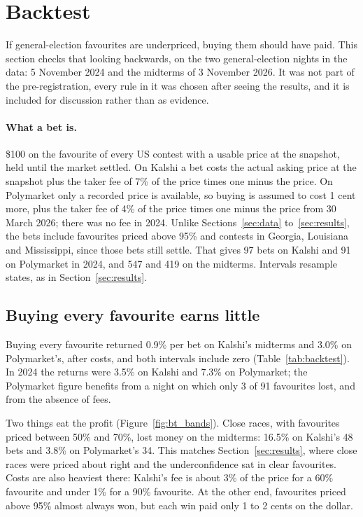 \section{Backtest}\label{sec:backtest}

If general-election favourites are underpriced, buying them should have paid. This section checks that looking
backwards, on the two general-election nights in the data: 5 November 2024 and the midterms of 3 November 2026. It was
not part of the pre-registration, every rule in it was chosen after seeing the results, and it is included for
discussion rather than as evidence.

\paragraph{What a bet is.} \$100 on the favourite of every US contest with a usable price at the snapshot, held until
the market settled. On Kalshi a bet costs the actual asking price at the snapshot plus the taker fee of 7\% of the price
times one minus the price. On Polymarket only a recorded price is available, so buying is assumed to cost 1 cent more,
plus the taker fee of 4\% of the price times one minus the price from 30 March 2026; there was no fee in 2024. Unlike
Sections~\ref{sec:data} to~\ref{sec:results}, the bets include favourites priced above 95\% and contests in Georgia,
Louisiana and Mississippi, since those bets still settle. That gives 97 bets on Kalshi and 91 on Polymarket in 2024,
and 547 and 419 on the midterms. Intervals resample states, as in Section~\ref{sec:results}.

\subsection{Buying every favourite earns little}

Buying every favourite returned 0.9\% per bet on Kalshi's midterms and 3.0\% on Polymarket's, after costs, and both
intervals include zero (Table~\ref{tab:backtest}). In 2024 the returns were 3.5\% on Kalshi and 7.3\% on Polymarket;
the Polymarket figure benefits from a night on which only 3 of 91 favourites lost, and from the absence of fees.

Two things eat the profit (Figure~\ref{fig:bt_bands}). Close races, with favourites priced between 50\% and 70\%, lost
money on the midterms: 16.5\% on Kalshi's 48 bets and 3.8\% on Polymarket's 34. This matches Section~\ref{sec:results},
where close races were priced about right and the underconfidence sat in clear favourites. Costs are also heaviest
there: Kalshi's fee is about 3\% of the price for a 60\% favourite and under 1\% for a 90\% favourite. At the other end,
favourites priced above 95\% almost always won, but each win paid only 1 to 2 cents on the dollar.

